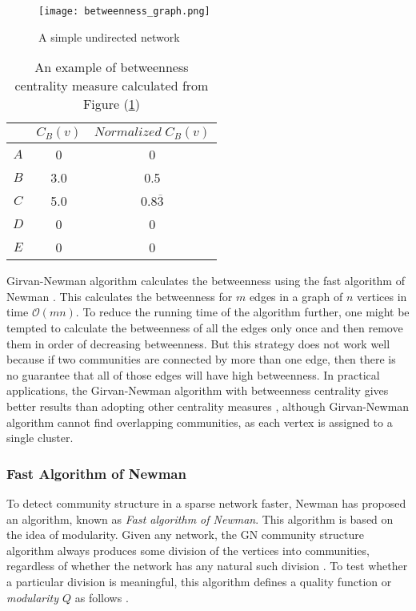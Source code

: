 {\begin{figure}[H]
	\centering
	\texttt{[image: betweenness\_graph.png]}
	\caption{A simple undirected network}
	\label{betweenness_graph}
\end{figure}

\begin{table}[!h]
	\centering
	\begin{tabular}{|c | c | c |}
		\cline{2-3}\multicolumn{1}{c|}{} 
		& 		$C_{B}(v)$	& $Normalized \; C_{B}(v)$ \\\hline 
		$A$		& 0 		& 0 						\\\hline 
		$B$ 	& 3.0		& 0.5 						\\\hline 
		$C$ 	& 5.0		& 0.8$\overline{3}$ 		\\\hline 
		$D$ 	& 0 		& 0							\\\hline 
		$E$ 	& 0 		& 0 						\\\hline 
	\end{tabular}
	\caption{An example of betweenness centrality measure calculated from Figure (\ref{betweenness_graph})}
\end{table}

Girvan-Newman algorithm calculates the betweenness using the fast algorithm of Newman \cite{ref-1, ref-13}. This calculates the betweenness for $m$ edges in a graph of $n$ vertices in time $\mathcal{O}(mn)$. To reduce the running time of the algorithm further, one might be tempted to calculate the betweenness of all the edges only once and then remove them in order of decreasing betweenness. But this strategy does not work well because if two communities are connected by more than one edge, then there is no guarantee that all of those edges will have high betweenness. In practical applications, the Girvan-Newman algorithm with betweenness centrality gives better results than adopting other centrality measures \cite{ref-12}, although Girvan-Newman algorithm cannot find overlapping communities, as each vertex is assigned to a single cluster.

\subsubsection*{Fast Algorithm of Newman}\label{sub:fastalgorithm}
To detect community structure in a sparse network faster, Newman has proposed an algorithm, known as \textit{Fast algorithm of Newman}. This algorithm is based on the idea of modularity. Given any network, the GN community structure algorithm \cite{ref-1} always produces some division of the vertices into communities, regardless of whether the network has any natural such division \cite{ref-13}. To test whether a particular division is meaningful, this algorithm defines a quality function or\textit{ modularity $Q$} as follows \cite{ref-1}.

}
